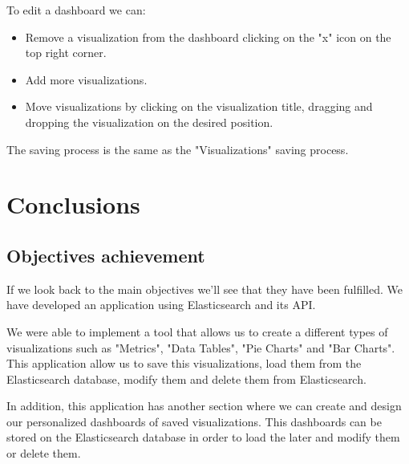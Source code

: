 \documentclass[a4paper, 12pt, english]{book}
\begin{document}
To edit a dashboard we can:
\begin{itemize}
    \item Remove a visualization from the dashboard clicking on the "x" icon on the top right corner.
    \item Add more visualizations.
    \item Move visualizations by clicking on the visualization title, dragging and dropping the visualization on the desired position.
\end{itemize}

The saving process is the same as the "Visualizations" saving process.





\cleardoublepage
\chapter{Conclusions}
\label{chap:conclusions}

\section{Objectives achievement}
\label{sec:objectives-achievement}

If we look back to the main objectives we'll see that they have been fulfilled. We have developed an application using Elasticsearch and its API.

We were able to implement a tool that allows us to create a different types of visualizations such as "Metrics", "Data Tables", "Pie Charts" and "Bar Charts". This application allow us to save this visualizations, load them from the Elasticsearch database, modify them and delete them from Elasticsearch.

In addition, this application has another section where we can create and design our personalized dashboards of saved visualizations. This dashboards can be stored on the Elasticsearch database in order to load the later and modify them or delete them.
\end{document}
